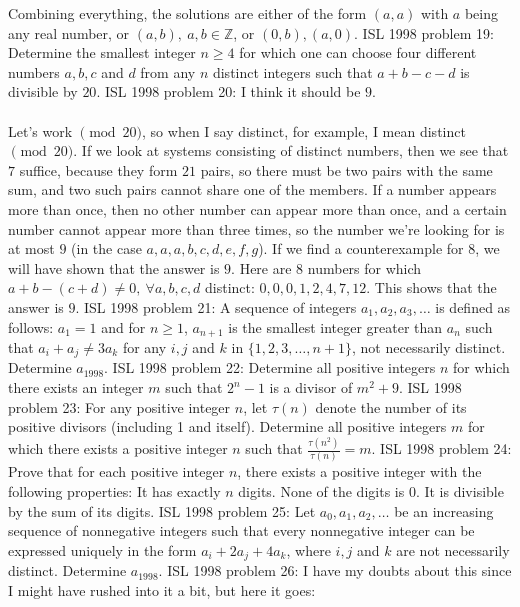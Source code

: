 Combining everything, the solutions are either of the form $(a,a)$ with $a$ being any real number, or $(a,b),\ a,b\in\mathbb Z$, or $(0,b),(a,0)$. 
ISL 1998 problem 19:  Determine the smallest integer $n\geq 4$ for which one can choose four different numbers $a,b,c$ and $d$ from any $n$ distinct integers such that $a+b-c-d$ is divisible by $20$. 
ISL 1998 problem 20:  I think it should be $9$. \\\\
Let's work $\pmod{20}$, so when I say distinct, for example, I mean distinct $\pmod{20}$. If we look at systems consisting of distinct numbers, then we see that $7$ suffice, because they form $21$ pairs, so there must be two pairs with the same sum, and two such pairs cannot share one of the members. If a number appears more than once, then no other number can appear more than once, and a certain number cannot appear more than three times, so the number we're looking for is at most $9$ (in the case $a,a,a,b,c,d,e,f,g$). If we find a counterexample for $8$, we will have shown that the answer is $9$. Here are $8$ numbers for which $a+b-(c+d)\ne 0,\ \forall a,b,c,d$ distinct: $0,0,0,1,2,4,7,12$. This shows that the answer is $9$. 
ISL 1998 problem 21:  A sequence of integers $ a_1,a_2,a_3,\ldots$ is defined as follows: $ a_1 = 1$ and for $ n\geq 1$, $ a_{n + 1}$ is the smallest integer greater than $ a_n$ such that $ a_i + a_j\neq 3a_k$ for any $ i,j$ and $ k$ in $ \{1,2,3,\ldots ,n + 1\}$, not necessarily distinct. Determine $ a_{1998}$. 
ISL 1998 problem 22:  Determine all positive integers $n$ for which there exists an integer $m$ such that ${2^n-1}$ is a divisor of ${m^2+9}$. 
ISL 1998 problem 23:  For any positive integer $n$, let $\tau (n)$ denote the number of its positive divisors (including 1 and itself). Determine all positive integers $m$ for which there exists a positive integer $n$ such that $\frac{\tau (n^2)}{\tau (n)}=m$. 
ISL 1998 problem 24:  Prove that for each positive integer $n$, there exists a positive integer with the following properties: It has exactly $n$ digits. None of the digits is 0. It is divisible by the sum of its digits. 
ISL 1998 problem 25:  Let $a_0,a_1,a_2,\ldots $ be an increasing sequence of nonnegative integers such that every nonnegative integer can be expressed uniquely in the form $a_i+2a_j+4a_k$, where $i,j$ and $k$ are not necessarily distinct. Determine $a_{1998}$. 
ISL 1998 problem 26:  I have my doubts about this since I might have rushed into it a bit, but here it goes: \\\\
